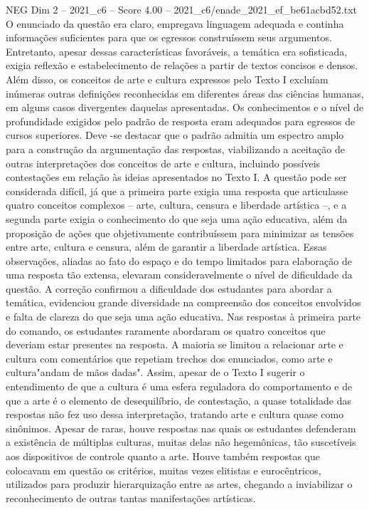 \begin{textsample}{NEG Dim 2 – 2021\_c6 – Score 4.00 – 2021\_c6/enade\_2021\_ef\_be61acbd52.txt}
O enunciado da questão era claro, empregava linguagem adequada e continha informações suficientes para que os egressos construíssem seus argumentos.
Entretanto, apesar dessas características favoráveis, a temática era sofisticada, exigia reflexão e estabelecimento de relações a partir de textos concisos e densos.
Além disso, os conceitos de arte e cultura expressos pelo Texto I excluíam inúmeras outras definições reconhecidas em diferentes áreas das ciências humanas, em alguns casos divergentes daquelas apresentadas.
Os conhecimentos e o nível de profundidade exigidos pelo padrão de resposta eram adequados para egressos de cursos superiores.
Deve -se destacar que o padrão admitia um espectro amplo para a construção da argumentação das respostas, viabilizando a aceitação de outras interpretações dos conceitos de arte e cultura, incluindo possíveis contestações em relação às ideias apresentados no Texto I.
A questão pode ser considerada difícil, já que a primeira parte exigia uma resposta que articulasse quatro conceitos complexos – arte, cultura, censura e liberdade artística –, e a segunda parte exigia o conhecimento do que seja uma ação educativa, além da proposição de ações que objetivamente contribuíssem para minimizar as tensões entre arte, cultura e censura, além de garantir a liberdade artística.
Essas observações, aliadas ao fato do espaço e do tempo limitados para elaboração de uma resposta tão extensa, elevaram consideravelmente o nível de dificuldade da questão.
A correção confirmou a dificuldade dos estudantes para abordar a temática, evidenciou grande diversidade na compreensão dos conceitos envolvidos e falta de clareza do que seja uma ação educativa.
Nas respostas à primeira parte do comando, os estudantes raramente abordaram os quatro conceitos que deveriam estar presentes na resposta.
A maioria se limitou a relacionar arte e cultura com comentários que repetiam trechos dos enunciados, como arte e cultura"andam de mãos dadas".
Assim, apesar de o Texto I sugerir o entendimento de que a cultura é uma esfera reguladora do comportamento e de que a arte é o elemento de desequilíbrio, de contestação, a quase totalidade das respostas não fez uso dessa interpretação, tratando arte e cultura quase como sinônimos.
Apesar de raras, houve respostas nas quais os estudantes defenderam a existência de múltiplas culturas, muitas delas não hegemônicas, tão suscetíveis aos dispositivos de controle quanto a arte.
Houve também respostas que colocavam em questão os critérios, muitas vezes elitistas e eurocêntricos, utilizados para produzir hierarquização entre as artes, chegando a inviabilizar o reconhecimento de outras tantas manifestações artísticas.

\end{textsample}
